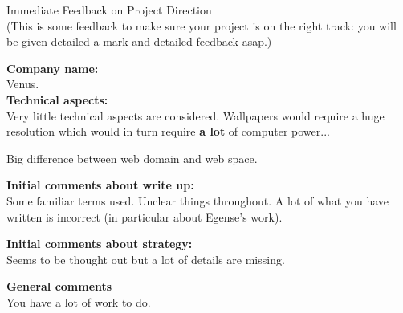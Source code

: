 \documentclass{article}
\begin{document}
\begin{center}
\Huge{Immediate Feedback on Project Direction}\\
\tiny{(This is some feedback to make sure your project is on the right track: you will be given detailed a mark and detailed feedback asap.)}
\end{center}


\normalsize
\textbf{Company name:}\\

Venus. \\

\textbf{Technical aspects:}\\

Very little technical aspects are considered.
Wallpapers would require a huge resolution which would in turn require \textbf{a lot} of computer power...

Big difference between web domain and web space.

\textbf{Initial comments about write up:}\\

Some familiar terms used.
Unclear things throughout.
A lot of what you have written is incorrect (in particular about Egense's work).

\textbf{Initial comments about strategy:}\\

Seems to be thought out but a lot of details are missing.

\textbf{General comments}\\

You have a lot of work to do.
\end{document}
